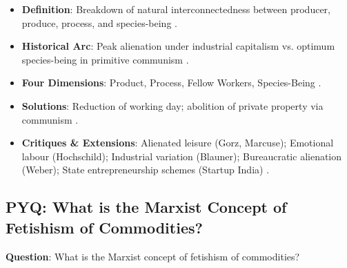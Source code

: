 \begin{QuickRevision}
\begin{itemize}
    \item \textbf{Definition}: Breakdown of natural interconnectedness between producer, produce, process, and species-being .
    \item \textbf{Historical Arc}: Peak alienation under industrial capitalism vs. optimum species-being in primitive communism .
    \item \textbf{Four Dimensions}: Product, Process, Fellow Workers, Species-Being .
    \item \textbf{Solutions}: Reduction of working day; abolition of private property via communism .
    \item \textbf{Critiques \& Extensions}: Alienated leisure (Gorz, Marcuse); Emotional labour (Hochschild); Industrial variation (Blauner); Bureaucratic alienation (Weber); State entrepreneurship schemes (Startup India) .
\end{itemize}
\end{QuickRevision}

\subsection{PYQ: What is the Marxist Concept of Fetishism of Commodities?}

\begin{PYQLink}
\textbf{Question}: What is the Marxist concept of fetishism of commodities? 
\end{PYQLink}

